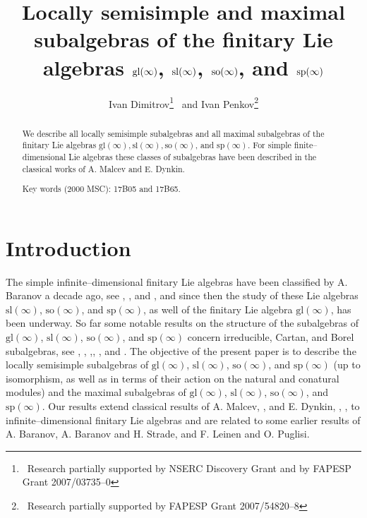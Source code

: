 \documentclass[oneside,leqno,12pt]{article}
\title{Locally semisimple and maximal subalgebras of the finitary Lie algebras $\gl(\infty)$, $\sl(\infty)$, $\so(\infty)$, and $\sp(\infty)$}
\author{Ivan Dimitrov\thanks{\, Research partially supported by NSERC Discovery Grant and by FAPESP Grant 2007/03735--0} \, and 
Ivan Penkov\thanks{\, Research partially supported by FAPESP Grant 2007/54820--8}}
\date{\empty}
\renewcommand{\sp}{\mathrm{sp}}
\newcommand{\gl}{\mathrm{gl}}
\renewcommand{\sl}{\mathrm{sl}}
\newcommand{\so}{\mathrm{so}}
\begin{document}
\maketitle

\vskip-3.5in 
\hskip1.75in
\vskip3in



\begin{abstract}
We describe all locally semisimple subalgebras and all maximal subalgebras of the 
finitary Lie algebras $\gl(\infty), \sl(\infty), \so(\infty)$, and $\sp(\infty)$. For simple finite--dimensional Lie algebras these 
classes of subalgebras
have been described in the classical works of A. Malcev and E. Dynkin.

Key words (2000 MSC): 17B05 and 17B65.
\end{abstract}



\section*{Introduction}
The simple infinite--dimensional finitary Lie algebras have been classified by A. Baranov a decade ago,
see \cite{Ba33}, \cite{Ba}, and \cite{BS}, and since then 
the study of these Lie algebras $\sl(\infty)$, $\so(\infty)$, and $\sp(\infty)$, as well of the finitary Lie algebra
$\gl(\infty)$, has been underway. So far some 
notable results on the structure of the subalgebras of  $\gl(\infty)$, $\sl(\infty)$, $\so(\infty)$, and $\sp(\infty)$ concern irreducible,
Cartan, and Borel subalgebras, see \cite{LP}, \cite{BS}, \cite{NP},\cite{DPS}, \cite{DP2}, and \cite{Da}. 
The objective of the present paper is to describe the locally semisimple subalgebras of 
$\gl(\infty)$, $\sl(\infty)$, $\so(\infty)$, and $\sp(\infty)$ (up to isomorphism, as well as in terms of their action on
the natural and conatural modules) and the maximal subalgebras of 
$\gl(\infty)$, $\sl(\infty)$, $\so(\infty)$, and $\sp(\infty)$.
 Our results extend classical results of A. Malcev, \cite{M}, and E. Dynkin, \cite{Dy1}, \cite{Dy2}, to 
infinite--dimensional finitary Lie algebras and are related to some earlier results of
A. Baranov,  A. Baranov and H. Strade, and F. Leinen and O. Puglisi. 
\end{document}
